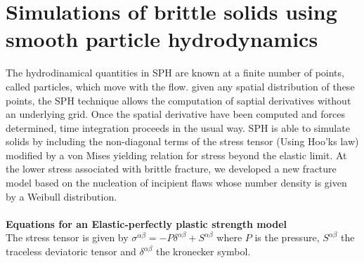 \documentclass[12pt]{book}
\begin{document}
\chapter{Simulations of brittle solids using smooth particle hydrodynamics}
The hydrodinamical quantities in SPH are known at a finite number of points, called particles, which move with the flow. given any spatial distribution of these points, the SPH technique allows the computation of saptial derivatives without an underlying grid. Once the spatial derivative have been computed and forces determined, time integration proceeds in the usual way.\cite{benz95}
SPH is able to simulate solids by including the non-diagonal terms of the stress tensor (Using Hoo'ks law) modified by a von Mises yielding relation for stress beyond the elastic limit. At the lower stress associated with brittle fracture, we developed a new fracture model based on the nucleation of incipient flaws whose number density is given by a Weibull distribution.\\\\

\textbf{Equations for an Elastic-perfectly plastic strength model\\}
The stress tensor is given by $\sigma^{\alpha\beta}=-P\delta^{\alpha\beta}+S^{\alpha\beta}$ where $P$ is the pressure, $S^{\alpha\beta}$ the traceless deviatoric tensor and $\delta^{\alpha\beta}$ the kronecker symbol. \\\\
\end{document}
